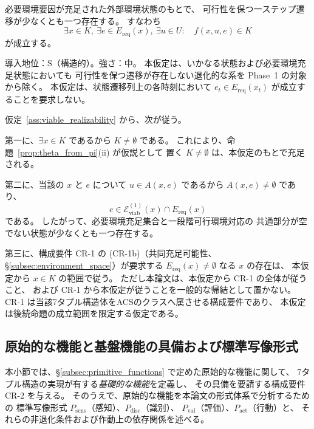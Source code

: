 \begin{assumption}[可行実現可能性]
\label{ass:viable_realizability}
必要環境要因が充足された外部環境状態のもとで、
可行性を保つ一ステップ遷移が少なくとも一つ存在する。
すなわち
\[
  \exists x\in K,\
  \exists e\in E_{\mathrm{req}}(x),\
  \exists u\in U:
  \quad
  f(x,u,e)\in K
\]
が成立する。

\medskip
\noindent
導入地位：S（構造的）。強さ：中。
本仮定は、いかなる状態および必要環境充足状態においても
可行性を保つ遷移が存在しない退化的な系を
Phase~1 の対象から除く。
本仮定は、状態遷移列上の各時刻において
$e_t\in E_{\mathrm{req}}(x_t)$ が成立することを要求しない。
\end{assumption}

\begin{remark}[可行実現可能性から従う事項]
\label{rem:viable_realizability_consequences}
仮定~\ref{ass:viable_realizability} から、次が従う。

第一に、$\exists x\in K$ であるから
$K\neq\emptyset$
である。
これにより、命題~\ref{prop:theta_from_pi}(ii) が仮説として
置く $K\neq\emptyset$ は、本仮定のもとで充足される。

第二に、当該の $x$ と $e$ について $u\in A(x,e)$ であるから
$A(x,e)\neq\emptyset$ であり、
\[
  e\in\mathcal{E}_{\mathrm{viab}}^{(1)}(x)
  \cap
  E_{\mathrm{req}}(x)
\]
である。
したがって、必要環境充足集合と一段階可行環境対応の
共通部分が空でない状態が少なくとも一つ存在する。

第三に、構成要件 CR-1 の (CR-1b)（共同充足可能性、
\S\ref{subsec:environment_space}）が要求する
$E_{\mathrm{req}}(x)\neq\emptyset$ なる $x$ の存在は、
本仮定から $x\in K$ の範囲で従う。
ただし本論文は、本仮定から CR-1 の全体が従うこと、
および CR-1 から本仮定が従うことを一般的な帰結として置かない。
CR-1 は当該7タプル構造体をACSのクラスへ属させる構成要件であり、
本仮定は後続命題の成立範囲を限定する仮定である。
\end{remark}

\subsection{原始的な機能と基盤機能の具備および標準写像形式}
\label{subsec:three_primitive_functions}

本小節では、\S\ref{subsec:primitive_functions} で定めた原始的な機能に関して、
7タプル構造の実現が有する\emph{基礎的な機能}を定義し、
その具備を要請する構成要件 CR-2 を与える。
そのうえで、原始的な機能を本論文の形式体系で分析するための
標準写像形式 $P_{\mathrm{sens}}$（感知）、$P_{\mathrm{disc}}$（識別）、
$P_{\mathrm{val}}$（評価）、$P_{\mathrm{act}}$（行動）と、
それらの非退化条件および作動上の依存関係を述べる。

